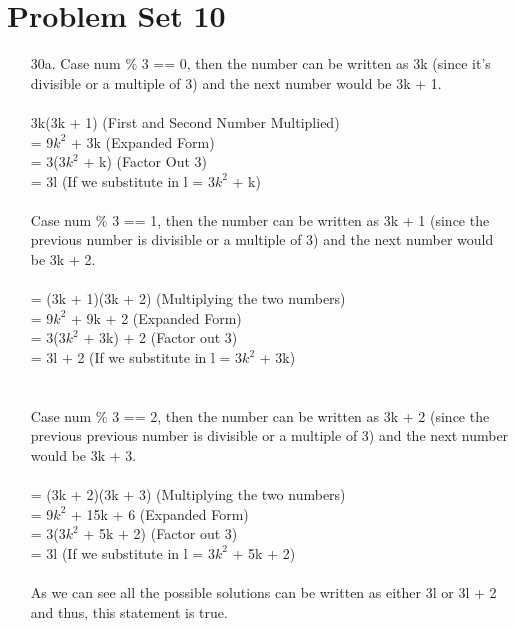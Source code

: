 \documentclass[12pt]{article}
\begin{document}
\section*{Problem Set 10}
\begin{itemize}
    \item [30a.]
        Case num $\%$ 3 == 0, then the number can be written as 3k (since it's divisible
        or a multiple of 3) and the next number would be 3k + 1. \\
        \\
        3k(3k + 1) (First and Second Number Multiplied) \\
        = 9$k^2$ + 3k (Expanded Form) \\
        = 3(3$k^2$ + k) (Factor Out 3) \\
        = 3l (If we substitute in l = 3$k^2$ + k) \\
        \\
        Case num $\%$ 3 == 1, then the number can be written as 3k + 1 (since the
        previous number is divisible or a multiple of 3) and the next number would be
        3k + 2. \\
        \\
        = (3k + 1)(3k + 2) (Multiplying the two numbers) \\
        = 9$k^2$ + 9k + 2 (Expanded Form) \\
        = 3(3$k^2$ + 3k) + 2 (Factor out 3) \\
        = 3l + 2 (If we substitute in l = 3$k^2$ + 3k) \\
        \\
        \\
        Case num $\%$ 3 == 2, then the number can be written as 3k + 2 (since the
        previous previous number is divisible or a multiple of 3) and the next number
        would be 3k + 3. \\
        \\
        = (3k + 2)(3k + 3) (Multiplying the two numbers) \\
        = 9$k^2$ + 15k + 6 (Expanded Form) \\
        = 3(3$k^2$ + 5k + 2) (Factor out 3) \\
        = 3l (If we substitute in l = 3$k^2$ + 5k + 2) \\
        \\
        As we can see all the possible solutions can be written as either 3l or 3l + 2
        and thus, this statement is true.
\end{itemize}
\end{document}
